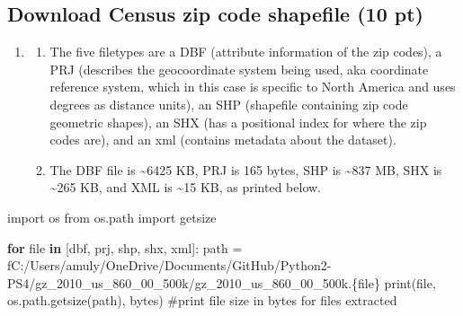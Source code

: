 \documentclass[
  letterpaper,
  DIV=11,
  numbers=noendperiod]{scrartcl}
\newenvironment{Shaded}{\begin{snugshade}}{\end{snugshade}}
\newcommand{\BuiltInTok}[1]{\textcolor[rgb]{0.00,0.23,0.31}{#1}}
\newcommand{\CommentTok}[1]{\textcolor[rgb]{0.37,0.37,0.37}{#1}}
\newcommand{\ControlFlowTok}[1]{\textcolor[rgb]{0.00,0.23,0.31}{\textbf{#1}}}
\newcommand{\ImportTok}[1]{\textcolor[rgb]{0.00,0.46,0.62}{#1}}
\newcommand{\KeywordTok}[1]{\textcolor[rgb]{0.00,0.23,0.31}{\textbf{#1}}}
\newcommand{\NormalTok}[1]{\textcolor[rgb]{0.00,0.23,0.31}{#1}}
\newcommand{\OperatorTok}[1]{\textcolor[rgb]{0.37,0.37,0.37}{#1}}
\newcommand{\SpecialCharTok}[1]{\textcolor[rgb]{0.37,0.37,0.37}{#1}}
\newcommand{\SpecialStringTok}[1]{\textcolor[rgb]{0.13,0.47,0.30}{#1}}
\newcommand{\StringTok}[1]{\textcolor[rgb]{0.13,0.47,0.30}{#1}}
\providecommand{\tightlist}{%
  \setlength{\itemsep}{0pt}\setlength{\parskip}{0pt}}\usepackage{longtable,booktabs,array}
\begin{document}
\subsection{Download Census zip code shapefile (10
pt)}\label{download-census-zip-code-shapefile-10-pt}

\begin{enumerate}
\def\labelenumi{\arabic{enumi}.}
\tightlist
\item
  \begin{enumerate}
  \def\labelenumii{\alph{enumii}.}
  \tightlist
  \item
    The five filetypes are a DBF (attribute information of the zip
    codes), a PRJ (describes the geocoordinate system being used, aka
    coordinate reference system, which in this case is specific to North
    America and uses degrees as distance units), an SHP (shapefile
    containing zip code geometric shapes), an SHX (has a positional
    index for where the zip codes are), and an xml (contains metadata
    about the dataset).
  \item
    The DBF file is \textasciitilde6425 KB, PRJ is 165 bytes, SHP is
    \textasciitilde837 MB, SHX is \textasciitilde265 KB, and XML is
    \textasciitilde15 KB, as printed below.
  \end{enumerate}
\end{enumerate}

\begin{Shaded}
\begin{Highlighting}[]
\ImportTok{import}\NormalTok{ os}
\ImportTok{from}\NormalTok{ os.path }\ImportTok{import}\NormalTok{ getsize}

\ControlFlowTok{for} \BuiltInTok{file} \KeywordTok{in}\NormalTok{ [}\StringTok{\textquotesingle{}dbf\textquotesingle{}}\NormalTok{, }\StringTok{\textquotesingle{}prj\textquotesingle{}}\NormalTok{, }\StringTok{\textquotesingle{}shp\textquotesingle{}}\NormalTok{, }\StringTok{\textquotesingle{}shx\textquotesingle{}}\NormalTok{, }\StringTok{\textquotesingle{}xml\textquotesingle{}}\NormalTok{]:}
\NormalTok{    path }\OperatorTok{=} \SpecialStringTok{f\textquotesingle{}C:/Users/amuly/OneDrive/Documents/GitHub/Python2{-}PS4/gz\_2010\_us\_860\_00\_500k/gz\_2010\_us\_860\_00\_500k.}\SpecialCharTok{\{}\BuiltInTok{file}\SpecialCharTok{\}}\SpecialStringTok{\textquotesingle{}}
    \BuiltInTok{print}\NormalTok{(}\BuiltInTok{file}\NormalTok{, os.path.getsize(path), }\StringTok{\textquotesingle{}bytes\textquotesingle{}}\NormalTok{) }\CommentTok{\#print file size in bytes for files extracted}
\end{Highlighting}
\end{Shaded}
\end{document}
